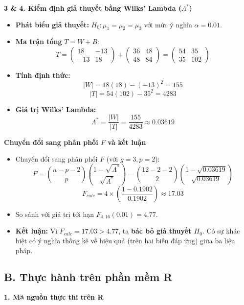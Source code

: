 \documentclass[12pt, a4paper]{article}
\begin{document}
\textbf{3 \& 4. Kiểm định giả thuyết bằng Wilks' Lambda ($\Lambda^*$)}

\begin{itemize}
    \item \textbf{Phát biểu giả thuyết:} $H_0 : \mu_1 = \mu_2 = \mu_3$ với mức ý nghĩa $\alpha = 0.01$.
    \item \textbf{Ma trận tổng} $T = W + B$:
    \[ T = \begin{pmatrix} 18 & -13 \\ -13 & 18 \end{pmatrix} + \begin{pmatrix} 36 & 48 \\ 48 & 84 \end{pmatrix} = \begin{pmatrix} 54 & 35 \\ 35 & 102 \end{pmatrix} \]
    \item \textbf{Tính định thức:}
    \[ |W| = 18(18) - (-13)^2 = 155 \]
    \[ |T| = 54(102) - 35^2 = 4283 \]
    \item \textbf{Giá trị Wilks' Lambda:}
    \[ \Lambda^* = \frac{|W|}{|T|} = \frac{155}{4283} \approx 0.03619 \]
\end{itemize}

\textbf{Chuyển đổi sang phân phối $F$ và kết luận}

\begin{itemize}
    \item Chuyển đổi sang phân phối $F$ (với $g = 3, p = 2$):
    \[ F = \left( \frac{n - p - 2}{p} \right) \left( \frac{1 - \sqrt{\Lambda^*}}{\sqrt{\Lambda^*}} \right) = \left( \frac{12 - 2 - 2}{2} \right) \left( \frac{1 - \sqrt{0.03619}}{\sqrt{0.03619}} \right) \]
    \[ F_{calc} = 4 \times \left( \frac{1 - 0.1902}{0.1902} \right) \approx 17.03 \]
    \item So sánh với giá trị tới hạn $F_{4, 16}(0.01) = 4.77$.
    \item \textbf{Kết luận:} Vì $F_{calc} = 17.03 > 4.77$, ta \textbf{bác bỏ giả thuyết $H_0$}. Có sự khác biệt có ý nghĩa thống kê về hiệu quả (trên hai biến đáp ứng) giữa ba liệu pháp.
\end{itemize}

\subsection*{B. Thực hành trên phần mềm R}

\textbf{1. Mã nguồn thực thi trên R}
\end{document}
